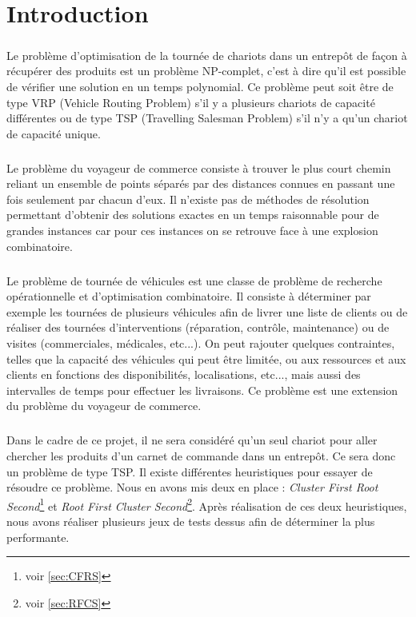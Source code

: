 \documentclass[twoside,UTF8]{EPURapport}
\begin{document}

\chapter{Introduction}

\paragraph{}
Le problème d'optimisation de la tournée de chariots dans un entrepôt de façon à récupérer des produits est un problème NP-complet, c'est à dire qu'il est possible de vérifier une solution en un temps polynomial. Ce problème peut soit être de type VRP (Vehicle Routing Problem) s'il y a plusieurs chariots de capacité différentes ou de type TSP (Travelling Salesman Problem) s'il n'y a qu'un chariot de capacité unique. 
\paragraph{}
Le problème du voyageur de commerce consiste à trouver le plus court chemin reliant un ensemble de points séparés par des distances connues en passant une fois seulement par chacun d'eux. Il n'existe pas de méthodes de résolution permettant d'obtenir des solutions exactes en un temps raisonnable pour de grandes instances car pour ces instances on se retrouve face à une explosion combinatoire.
\paragraph{}
Le problème de tournée de véhicules est une classe de problème de recherche opérationnelle et d'optimisation combinatoire. Il consiste à déterminer par exemple les tournées de plusieurs véhicules afin de livrer une liste de clients ou de réaliser des tournées d'interventions (réparation, contrôle, maintenance) ou de visites (commerciales, médicales, etc...). On peut rajouter quelques contraintes, telles que la capacité des véhicules qui peut être limitée, ou aux ressources et aux clients en fonctions des disponibilités, localisations, etc..., mais aussi des intervalles de temps pour effectuer les livraisons. Ce problème est une extension du problème du voyageur de commerce. 
\paragraph{}Dans le cadre de ce projet, il ne sera considéré qu'un seul chariot pour aller chercher les produits d'un carnet de commande dans un entrepôt. Ce sera donc un problème de type TSP. Il existe différentes heuristiques pour essayer de résoudre ce problème. Nous en avons mis deux en place : \textit{Cluster First Root Second}\footnote{voir \ref{sec:CFRS}} et \textit{Root First Cluster Second}\footnote{voir \ref{sec:RFCS}}. Après réalisation de ces deux heuristiques, nous avons réaliser plusieurs jeux de tests dessus afin de déterminer la plus performante.
\end{document}
